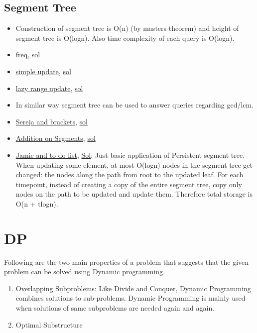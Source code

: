 \documentclass[8pt, a4paper, oneside, twocolumn]{extarticle}
\begin{document}
\subsection{Segment Tree}
\begin{itemize}
    \item Construction of segment tree is O(n) (by masters theorem) and height of segment tree is O(logn). Also time complexity of each query is O(logn).
    \item \href{https://uva.onlinejudge.org/external/112/11235.pdf}{freq}, \href{https://gist.github.com/sourabh2311/adf33f80e4b1e95bdb7d7a0e28ae23e6}{sol}
    \item \href{https://uva.onlinejudge.org/external/112/11297.pdf}{simple update}, \href{https://gist.github.com/sourabh2311/1376c934be55a72ca3f7c6f7481125ca}{sol}
    \item \href{https://uva.onlinejudge.org/external/114/11402.pdf}{lazy range update}, \href{https://github.com/sourabh2311/Competitive-Programming/blob/master/UVA_11402.cpp}{sol}
    \item In similar way segment tree can be used to answer queries regarding gcd/lcm.
    \item \href{https://codeforces.com/problemset/problem/380/C}{Sereja and brackets}, \href{https://github.com/sourabh2311/Competitive-Programming/blob/master/CF/Data%20Structures/Segment%20Tree/380C%20-%20Seraja%20And%20Brackets.cpp}{sol}
    \item \href{https://codeforces.com/problemset/problem/981/E}{Addition on Segments}, \href{https://github.com/sourabh2311/Competitive-Programming/blob/master/CF/Data%20Structures/Segment%20Tree/Problem%20-%20E%20Addition%20On%20Segments_sol_tourist.cpp}{sol}
    \item \href {https://codeforces.com/contest/916/problem/D}{Jamie and to do list}, \href {https://github.com/sourabh2311/Competitive-Programming/blob/master/CF/457D2/D.cpp}{Sol}: Just basic application of Persistent segment tree. When updating some element, at most O(logn) nodes in the segment tree get changed: the nodes along the path from root to the updated leaf. For each timepoint, instead of creating a copy of the entire segment tree, copy only nodes on the path to be updated and update them. Therefore total storage is O(n + t\*logn).
\end{itemize}
\section{DP}
Following are the two main properties of a problem that suggests that the given problem can be solved using Dynamic programming.
\begin{enumerate}
    \item Overlapping Subproblems: Like Divide and Conquer, Dynamic Programming combines solutions to sub-problems. Dynamic Programming is mainly used when solutions of same subproblems are needed again and again.
    \item Optimal Substructure
\end{enumerate}
\end{document}
